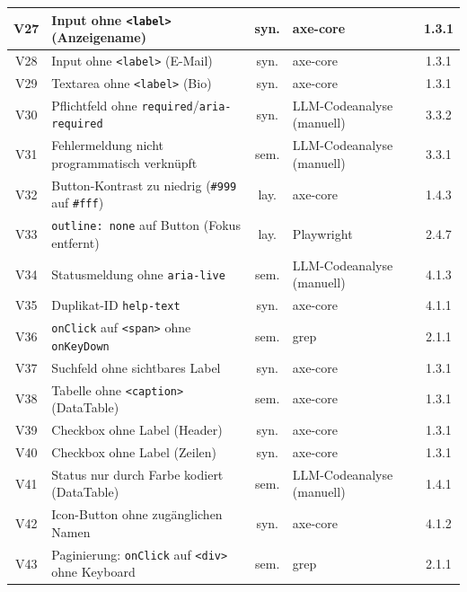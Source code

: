 \begin{longtable}{|c|p{6.4cm}|c|p{4.0cm}|c|}
V27 & Input ohne \texttt{<label>} (Anzeigename)                     & syn. & axe-core                & 1.3.1 \\ \hline
V28 & Input ohne \texttt{<label>} (E-Mail)                          & syn. & axe-core                & 1.3.1 \\ \hline
V29 & Textarea ohne \texttt{<label>} (Bio)                          & syn. & axe-core                & 1.3.1 \\ \hline
V30 & Pflichtfeld ohne \texttt{required}/\texttt{aria-required}     & syn. & LLM-Codeanalyse (manuell)& 3.3.2 \\ \hline
V31 & Fehlermeldung nicht programmatisch verknüpft                  & sem. & LLM-Codeanalyse (manuell)& 3.3.1 \\ \hline
V32 & Button-Kontrast zu niedrig (\texttt{\#999} auf \texttt{\#fff})& lay. & axe-core                & 1.4.3 \\ \hline
V33 & \texttt{outline: none} auf Button (Fokus entfernt)            & lay. & Playwright              & 2.4.7 \\ \hline
V34 & Statusmeldung ohne \texttt{aria-live}                         & sem. & LLM-Codeanalyse (manuell)& 4.1.3 \\ \hline
V35 & Duplikat-ID \texttt{help-text}                                & syn. & axe-core                & 4.1.1 \\ \hline
V36 & \texttt{onClick} auf \texttt{<span>} ohne \texttt{onKeyDown}  & sem. & grep                    & 2.1.1 \\ \hline
V37 & Suchfeld ohne sichtbares Label                                & syn. & axe-core                & 1.3.1 \\ \hline
V38 & Tabelle ohne \texttt{<caption>} (DataTable)                   & sem. & axe-core                & 1.3.1 \\ \hline
V39 & Checkbox ohne Label (Header)                                  & syn. & axe-core                & 1.3.1 \\ \hline
V40 & Checkbox ohne Label (Zeilen)                                  & syn. & axe-core                & 1.3.1 \\ \hline
V41 & Status nur durch Farbe kodiert (DataTable)                    & sem. & LLM-Codeanalyse (manuell)& 1.4.1 \\ \hline
V42 & Icon-Button ohne zugänglichen Namen                           & syn. & axe-core                & 4.1.2 \\ \hline
V43 & Paginierung: \texttt{onClick} auf \texttt{<div>} ohne Keyboard& sem. & grep                    & 2.1.1 \\ \hline

\end{longtable}
